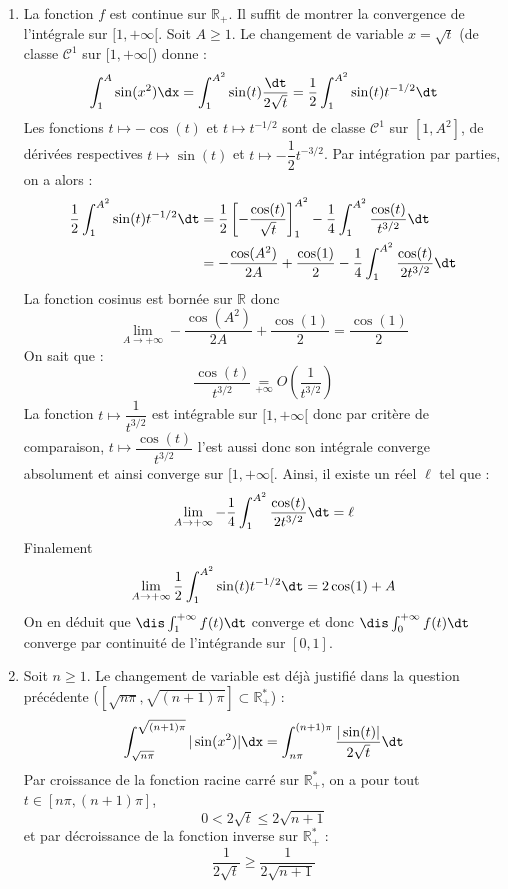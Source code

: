 \documentclass[a4paper,10pt]{report}
\begin{document}
\begin{enumerate}
\item La fonction $f$ est continue sur $\mathbb{R}_+$. Il suffit de montrer la convergence de l'intégrale sur $[1, + \infty[$. Soit $A \geq 1$. Le changement de variable $x= \sqrt{t}$ (de classe $\mathcal{C}^1$ sur $[1, + \infty[$) donne :
$$ \int_1^A \sin(x^2) \dx = \int_1^{A^2} \sin(t) \dfrac{\dt}{2 \sqrt{t}} = \dfrac{1}{2} \int_1^{A^2} \sin(t) t^{-1/2} \dt$$
Les fonctions $t \mapsto - \cos(t)$ et $t \mapsto t^{-1/2}$ sont de classe $\mathcal{C}^1$ sur $[1, A^2]$, de dérivées respectives $t \mapsto \sin(t)$ et $t \mapsto - \dfrac{1}{2} t^{-3/2}$. Par intégration par parties, on a alors :
\begin{align*}
\dfrac{1}{2} \int_1^{A^2} \sin(t) t^{-1/2} \dt & = \dfrac{1}{2}\left[- \dfrac{\cos(t)}{\sqrt{t}} \right]_1^{A^2} - \dfrac{1}{4} \int_1^{A^2} \dfrac{\cos(t)}{t^{3/2}} \dt \\
& = - \dfrac{ \cos(A^2)}{2A} +\dfrac{\cos(1)}{2}   -  \dfrac{1}{4}\int_1^{A^2} \dfrac{\cos(t)}{2t^{3/2}} \dt 
\end{align*}
La fonction cosinus est bornée sur $\mathbb{R}$ donc 
$$ \lim_{A \rightarrow + \infty}  - \dfrac{ \cos(A^2)}{2A} +\dfrac{\cos(1)}{2} =  \dfrac{\cos(1)}{2}$$
On sait que :
$$ \dfrac{\cos(t)}{t^{3/2}} \underset{+\infty}{=} O \left( \dfrac{1}{t^{3/2}} \right)$$
La fonction $t \mapsto  \dfrac{1}{t^{3/2}}$ est intégrable sur $[1, + \infty[$ donc par critère de comparaison, $t \mapsto \dfrac{\cos(t)}{t^{3/2}}$ l'est aussi donc son intégrale converge absolument et ainsi converge sur $[1, + \infty[$. Ainsi, il existe un réel $\ell$ tel que :
$$ \lim_{A \rightarrow + \infty} -\dfrac{1}{4} \int_1^{A^2} \dfrac{\cos(t)}{2t^{3/2}} \dt  = \ell$$
Finalement 
$$ \lim_{A \rightarrow + \infty} \dfrac{1}{2} \int_1^{A^2} \sin(t) t^{-1/2} \dt = 2 \cos(1) + A$$
On en déduit que $\dis \int_{1}^{+ \infty}  f(t) \dt$ converge et donc $\dis \int_{0}^{+ \infty}  f(t) \dt$ converge par continuité de l'intégrande sur $[0,1]$.
\item Soit $n \geq 1$. Le changement de variable est déjà justifié dans la question précédente ($[\sqrt{n \pi},\sqrt{(n+1)\pi}]\subset \mathbb{R}_+^*$) :
$$ \int_{\sqrt{n \pi}}^{\sqrt{(n+1)\pi}} \vert \sin(x^2) \vert \dx = \int_{n \pi}^{(n+1)\pi} \dfrac{\vert \sin(t) \vert}{2 \sqrt{t}} \dt$$
Par croissance de la fonction racine carré sur $\mathbb{R}_+^{*}$, on a pour tout $t \in [n \pi,(n+1)\pi]$, 
$$ 0<2 \sqrt{t} \leq 2 \sqrt{n+1}$$
et par décroissance de la fonction inverse sur $\mathbb{R}_+^{*}$ :
$$ \dfrac{1}{2\sqrt{t}} \geq \dfrac{1}{2\sqrt{n+1}}$$

\end{enumerate}
\end{document}
